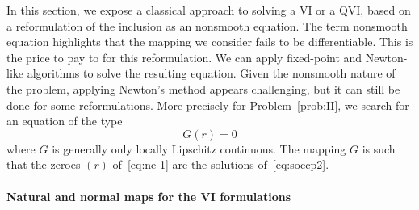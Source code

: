 {In this section, we expose a classical approach to solving a VI or a QVI, based on a reformulation of the inclusion as an nonsmooth equation.
The term nonsmooth equation highlights that the mapping we consider fails to be differentiable.
This is the price to pay to for this reformulation. We can apply fixed-point and Newton-like algorithms to solve the resulting equation.
Given the nonsmooth nature of the problem, applying Newton's method appears challenging, but it can still be done for some reformulations.
%
More precisely for Problem~\ref{prob:II}, we search for an equation of the type
\begin{equation}
  \label{eq:ne-1}
  G(r) = 0
\end{equation}
where $G$ is generally {only} locally Lipschitz continuous. The mapping $G$ is such that the zeroes $(r)$ of~\eqref{eq:ne-1} are the solutions of~\eqref{eq:soccp2}.

\paragraph{Natural and normal maps for the VI formulations}

}
